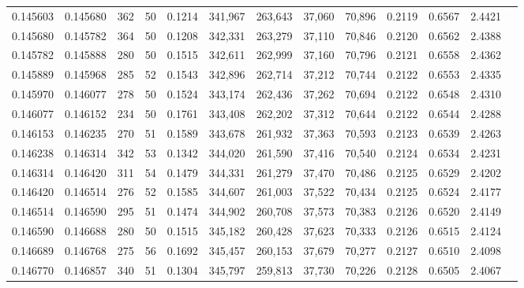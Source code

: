 \begin{tabular}{rrrrrrrrrrrrr}
0.145603 & 0.145680 &   362 &  50 &                                     0.1214 & 341,967 & 263,643 &  37,060 &  70,896 & 0.2119 & 0.6567 & 2.4421 \\
0.145680 & 0.145782 &   364 &  50 &                                     0.1208 & 342,331 & 263,279 &  37,110 &  70,846 & 0.2120 & 0.6562 & 2.4388 \\
0.145782 & 0.145888 &   280 &  50 &                                     0.1515 & 342,611 & 262,999 &  37,160 &  70,796 & 0.2121 & 0.6558 & 2.4362 \\
0.145889 & 0.145968 &   285 &  52 &                                     0.1543 & 342,896 & 262,714 &  37,212 &  70,744 & 0.2122 & 0.6553 & 2.4335 \\
0.145970 & 0.146077 &   278 &  50 &                                     0.1524 & 343,174 & 262,436 &  37,262 &  70,694 & 0.2122 & 0.6548 & 2.4310 \\
0.146077 & 0.146152 &   234 &  50 &                                     0.1761 & 343,408 & 262,202 &  37,312 &  70,644 & 0.2122 & 0.6544 & 2.4288 \\
0.146153 & 0.146235 &   270 &  51 &                                     0.1589 & 343,678 & 261,932 &  37,363 &  70,593 & 0.2123 & 0.6539 & 2.4263 \\
0.146238 & 0.146314 &   342 &  53 &                                     0.1342 & 344,020 & 261,590 &  37,416 &  70,540 & 0.2124 & 0.6534 & 2.4231 \\
0.146314 & 0.146420 &   311 &  54 &                                     0.1479 & 344,331 & 261,279 &  37,470 &  70,486 & 0.2125 & 0.6529 & 2.4202 \\
0.146420 & 0.146514 &   276 &  52 &                                     0.1585 & 344,607 & 261,003 &  37,522 &  70,434 & 0.2125 & 0.6524 & 2.4177 \\
0.146514 & 0.146590 &   295 &  51 &                                     0.1474 & 344,902 & 260,708 &  37,573 &  70,383 & 0.2126 & 0.6520 & 2.4149 \\
0.146590 & 0.146688 &   280 &  50 &                                     0.1515 & 345,182 & 260,428 &  37,623 &  70,333 & 0.2126 & 0.6515 & 2.4124 \\
0.146689 & 0.146768 &   275 &  56 &                                     0.1692 & 345,457 & 260,153 &  37,679 &  70,277 & 0.2127 & 0.6510 & 2.4098 \\
0.146770 & 0.146857 &   340 &  51 &                                     0.1304 & 345,797 & 259,813 &  37,730 &  70,226 & 0.2128 & 0.6505 & 2.4067 \\

\end{tabular}
